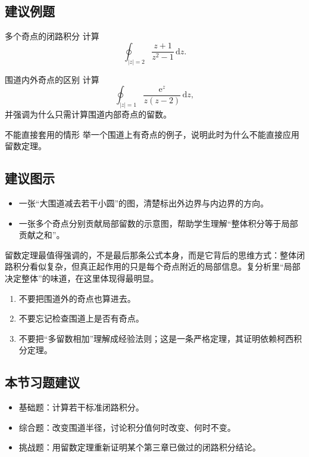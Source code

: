 \subsection*{建议例题}
\begin{lizi}{多个奇点的闭路积分}{}
计算
\[
    \oint_{|z|=2}\frac{z+1}{z^2-1}\,\mathrm{d}z.
\]
\end{lizi}

\begin{lizi}{围道内外奇点的区别}{}
计算
\[
    \oint_{|z|=1}\frac{\mathrm{e}^z}{z(z-2)}\,\mathrm{d}z,
\]
并强调为什么只需计算围道内部奇点的留数。
\end{lizi}

\begin{lizi}{不能直接套用的情形}{}
举一个围道上有奇点的例子，说明此时为什么不能直接应用留数定理。
\end{lizi}

\subsection*{建议图示}
\begin{itemize}
    \item 一张``大围道减去若干小圆''的图，清楚标出外边界与内边界的方向。
    \item 一张多个奇点分别贡献局部留数的示意图，帮助学生理解``整体积分等于局部贡献之和''。
\end{itemize}

\begin{tishi}[本节的思想重点]
留数定理最值得强调的，不是最后那条公式本身，而是它背后的思维方式：整体闭路积分看似复杂，但真正起作用的只是每个奇点附近的局部信息。复分析里``局部决定整体''的味道，在这里体现得最明显。
\end{tishi}

\begin{jinshi}[本节易错点]
\begin{enumerate}
    \item 不要把围道外的奇点也算进去。
    \item 不要忘记检查围道上是否有奇点。
    \item 不要把``多留数相加''理解成经验法则；这是一条严格定理，其证明依赖柯西积分定理。
\end{enumerate}
\end{jinshi}

\subsection*{本节习题建议}
\begin{itemize}
    \item 基础题：计算若干标准闭路积分。
    \item 综合题：改变围道半径，讨论积分值何时改变、何时不变。
    \item 挑战题：用留数定理重新证明某个第三章已做过的闭路积分结论。
\end{itemize}

